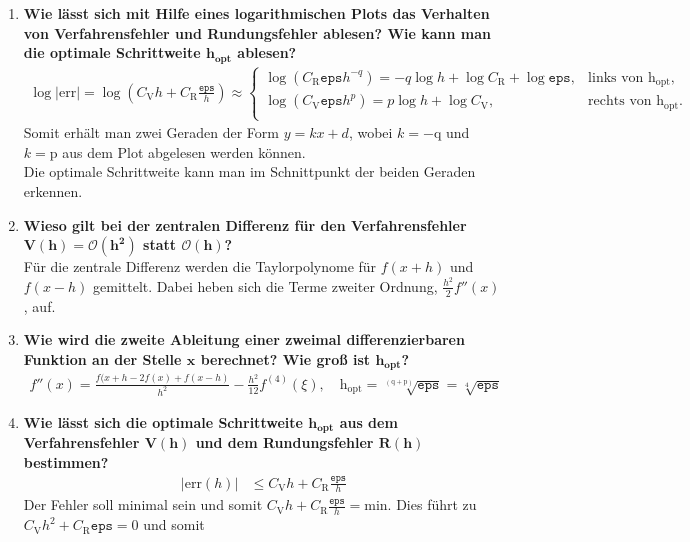 \begin{enumerate}
\begin{figure}[!htbp]
\begin{minipage}{.5\textwidth}
				\end{minipage}
			\end{figure}			
		\item \textbf{Wie lässt sich mit Hilfe eines logarithmischen Plots das Verhalten von Verfahrensfehler und Rundungsfehler ablesen? Wie kann man die optimale Schrittweite $\mathbf{h_{opt}}$ ablesen?}
			\begin{align*}
				\log |\text{err}|=\log \left( C_\text{V} h + C_\text{R} \frac{\texttt{eps}}{h}\right) \approx 
					\begin{cases}
						\log\left(C_\text{R}\texttt{eps}h^{-q}\right) =-q\log h + \log C_\text{R}+\log\texttt{eps}  , & \text{links von }  \text{h}_\text{opt},\\
						\log\left(C_\text{V}\texttt{eps}h^p\right) =p\log h + \log C_\text{V} , & \text{rechts von }  \text{h}_\text{opt}.		\\	
					\end{cases}
			\end{align*}
			Somit erhält man zwei Geraden der Form $y=kx+d$, wobei $k=-\text{q}$ und $k=\text{p}$ aus dem Plot abgelesen werden können.\\
			Die optimale Schrittweite kann man im Schnittpunkt der beiden Geraden erkennen. 
		\item \textbf{Wieso gilt bei der zentralen Differenz für den Verfahrensfehler $\mathbf{V(h)=\mathcal{O}(h^2)}$ statt $\mathbf{\mathcal{O}(h)}$?}\\
			Für die zentrale Differenz werden die Taylorpolynome für $f(x+h)$ und $f(x-h)$ gemittelt. Dabei heben sich die Terme zweiter Ordnung, $\frac{h^2}{2}f''(x)$, auf.
		\item \textbf{Wie wird die zweite Ableitung einer zweimal differenzierbaren Funktion an der Stelle $\mathbf{x}$ berechnet? Wie groß ist $\mathbf{h_{opt}}$?}
			\begin{align*}
				f''(x)=\frac{f(x+h-2f(x)+f(x-h)}{h^2}-\frac{h^2}{12}f^{(4)}(\xi), \quad \text{h}_\text{opt}=\sqrt[\left( \text{q}+\text{p}\right) ]{\texttt{eps}}=\sqrt[4]{\texttt{eps}}
			\end{align*}
		\item \textbf{Wie lässt sich die optimale Schrittweite $\mathbf{h_{opt}}$ aus dem Verfahrensfehler $\mathbf{V(h)}$ und dem Rundungsfehler $\mathbf{R(h)}$ bestimmen?}
			\begin{align*}
				|\text{err}(h)|&\leq C_\text{V} h + C_\text{R} \frac{\texttt{eps}}{h}
			\end{align*}
			Der Fehler soll minimal sein und somit $C_\text{V} h + C_\text{R} \frac{\texttt{eps}}{h}=\text{min}.$ Dies führt zu $C_\text{V} h^2 + C_\text{R}\texttt{eps}=0$ und somit

\end{enumerate}
